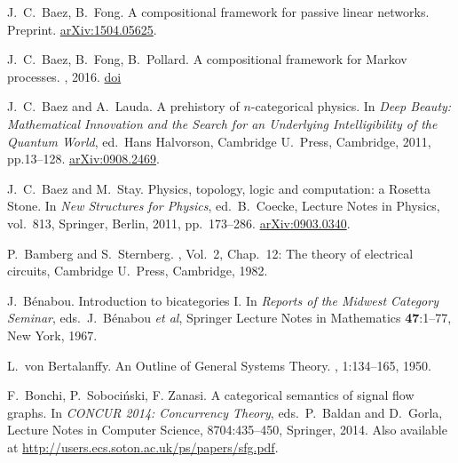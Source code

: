 \begin{thebibliography}{RSW00}
    J.\ C.\ Baez, B.\ Fong. 
    \newblock A compositional framework for passive linear networks.
    \newblock Preprint. 
    \newblock \href{http://arxiv.org/abs/1504.05625}{arXiv:1504.05625}. 

    J.\ C.\ Baez, B.\ Fong, B.\ Pollard. 
    \newblock A compositional framework for Markov processes.
    , 2016.
    \newblock \href{doi}{doi}

    J.\ C.\ Baez and A.\ Lauda.
    \newblock A prehistory of $n$-categorical
    physics. 
    \newblock In {\em Deep Beauty: Mathematical Innovation and
    the Search for an Underlying Intelligibility of the Quantum World}, ed.\
    Hans Halvorson, Cambridge U.\ Press, Cambridge, 2011, pp.13--128.  
    \newblock \href{http://arxiv.org/abs/0908.2469}{arXiv:0908.2469}.

    J.\ C.\ Baez and M.\ Stay. 
    \newblock Physics, topology, logic and 
    computation: a Rosetta Stone. 
    \newblock In {\sl New Structures for Physics}, ed.\ B.\ Coecke,  
    Lecture Notes in Physics, vol.\ 813, Springer, Berlin, 2011, pp.\ 173--286.
    \newblock \href{http://arxiv.org/abs/0903.0340}{arXiv:0903.0340}.

    P.\ Bamberg and S.\ Sternberg. 
    , Vol.\ 2, Chap.\ 12: The theory of electrical circuits,
    Cambridge U.\ Press, Cambridge, 1982. 

    J.\ B\'enabou.
    \newblock Introduction to bicategories I.
    \newblock In \textsl{Reports
    of the Midwest Category Seminar}, eds.\ J.\ B\'enabou \textit{et al},
    Springer Lecture Notes in Mathematics {\bf 47}:1--77, New York, 1967.


    L.\ von Bertalanffy. 
    \newblock An Outline of General Systems Theory.
    , 1:134--165,
    1950.

    F.\ Bonchi, P.\ Soboci\'nski, F. Zanasi.
    \newblock A categorical semantics of signal flow graphs.
    \newblock In \emph{CONCUR 2014: Concurrency Theory}, eds.\ P.\ Baldan and
    D.\ Gorla, Lecture Notes in Computer Science, 8704:435--450, Springer, 2014.
    \newblock Also available at
    \href{http://users.ecs.soton.ac.uk/ps/papers/sfg.pdf}
    {http://users.ecs.soton.ac.uk/ps/papers/sfg.pdf}.
    

\end{thebibliography}
